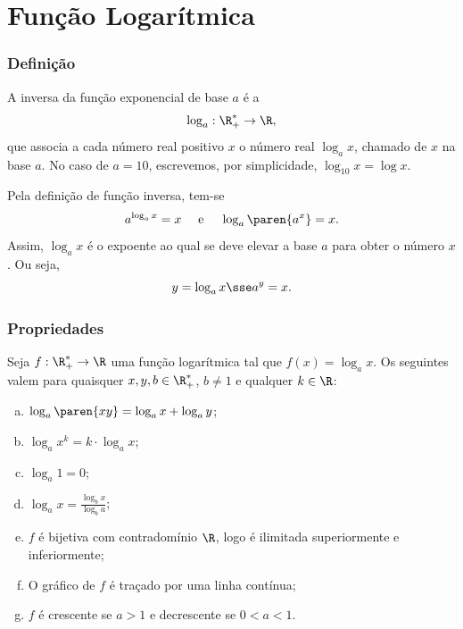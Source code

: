 \section{Função Logarítmica}
\begin{frame}
\frametitle{Definição} 
\begin{definicao}
A inversa da função exponencial de base $a$ é a 
$$\log_a : \R_+^\ast \to \R,$$
que associa a cada número real positivo $x$ o número real $\log_a
x$, chamado  de $x$ na base $a$. No caso de $a=10$,
escrevemos, por simplicidade, $\log_{10}x = \log
 x$.
\end{definicao}\pause
Pela definição de função inversa, tem-se
$$ a^{\log_a x}=x \ \ \ \text{ e } \ \ \ \log_a \paren{a^x} = x.$$
Assim, $\log_a x $ é o expoente ao qual se deve elevar a base $a$
para obter o número $x$. Ou seja,
$$ y = \log_a x \sse a^y = x.$$

\end{frame}


\begin{frame}
\frametitle{Propriedades} 

\begin{proposicao}
Seja $f: \R_+^\ast \to \R$ uma função logarítmica tal que $f(x) =
\log_a x$. Os seguintes valem para quaisquer  $x, y, b \in
\R_+^\ast$, $b \neq 1$ e qualquer $k \in \R$:
\begin{enumerate}[(a)]
	\item $\log_a \paren{xy} = \log_a x + \log_a y$;
	\item $\log_a x^k = k\cdot \log_a x$;
	\item $\log_a 1 = 0$;
	\item $\log_a x = \frac{\log_b x}{\log_b a}$;
	\item $f$ é bijetiva com contradomínio $\R$, logo é ilimitada superiormente e inferiormente;
	\item O gráfico de $f$ é traçado por uma linha contínua;
	\item $f$ é crescente se $a>1$ e decrescente se $0<a<1$.
\end{enumerate}
\end{proposicao}


\end{frame}

